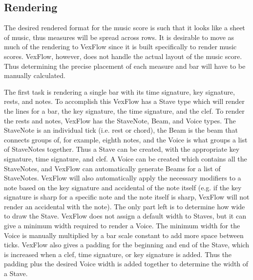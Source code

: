 \documentclass[letterpaper,12pt]{article}
\begin{document}
\subsection{Rendering}

The desired rendered format for the music score is such that it looks like a sheet of music, thus measures will be
spread across rows. It is desirable to move as much of the rendering to VexFlow since it is built specifically to render
music scores. VexFlow, however, does not handle the actual layout of the music score. Thus determining the precise 
placement of each measure and bar will have to be manually calculated. 

The first task is rendering a single bar with its time signature, key signature, rests, and notes. To accomplish this
VexFlow has a Stave type which will render the lines for a bar, the key signature, the time signature, and the clef. To
render the rests and notes, VexFlow has the StaveNote, Beam, and Voice types. The StaveNote is an individual tick (i.e.
rest or chord), the Beam is the beam that connects groups of, for example, eighth notes, and the Voice is what groups a
list of StaveNotes together. Thus a Stave can be created, with the appropriate key signature, time signature, and clef.
A Voice can be created which contains all the StaveNotes, and VexFlow can automatically generate Beams for a list of
StaveNotes. VexFlow will also automatically apply the necessary modifiers to a note based on the key signature and
accidental of the note itself (e.g. if the key signature is sharp for a specific note and the note itself is sharp,
VexFlow will not render an accidental with the note). The only part left is to determine how wide to draw the Stave.
VexFlow does not assign a default width to Staves, but it can give a minimum width required to render a Voice. The
minimum width for the Voice is manually multiplied by a bar scale constant to add more space between ticks. VexFlow also
gives a padding for the beginning and end of the Stave, which is increased when a clef, time signature, or key signature
is added. Thus the padding plus the desired Voice width is added together to determine the width of a Stave.
\end{document}
